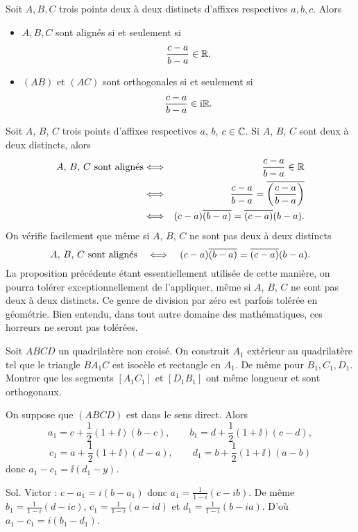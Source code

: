 \documentclass{magnolia}
\begin{document}
\begin{proposition}[utile=-3]
Soit $A,B,C$ trois points deux à deux distincts d'affixes respectives $a,b,c$. Alors
\begin{itemize}
\item $A,B,C$ sont alignés si et seulement si
  \[\frac{c-a}{b-a}\in\mathbb{R}.\]
\item $(AB)$ et $(AC)$ sont orthogonales si et seulement si
  \[\frac{c-a}{b-a}\in{\rm i}\mathbb{R}.\]
\end{itemize}
\end{proposition}

\begin{remarques}
\remarque Soit $A$, $B$, $C$ trois points d'affixes respectives $a$, $b$, $c\in\mathbb{C}$. Si $A$, $B$, $C$ sont deux à deux distincts, alors
  \begin{eqnarray*}
  \text{$A$, $B$, $C$ sont alignés}
  &\Longleftrightarrow& \frac{c-a}{b-a}\in\mathbb{R}\\
  &\Longleftrightarrow& \frac{c-a}{b-a}=\overline{\left(\frac{c-a}{b-a}\right)}\\
  &\Longleftrightarrow& (c-a)\overline{(b-a)}=\overline{(c-a)}(b-a).
  \end{eqnarray*}
  On vérifie facilement que même si $A$, $B$, $C$ ne sont pas deux à deux distincts
  \[\text{$A$, $B$, $C$ sont alignés} \quad\Longleftrightarrow\quad (c-a)\overline{(b-a)}=\overline{(c-a)}(b-a).\]
\remarque La proposition précédente étant essentiellement utilisée de cette manière, on pourra tolérer exceptionnellement de l'appliquer, même si $A$, $B$, $C$ ne sont pas deux à deux distincts. Ce genre de \og division par zéro \fg est parfois tolérée en géométrie. Bien entendu, dans tout autre domaine des mathématiques, ces horreurs ne seront pas tolérées.
\end{remarques}

\begin{exoUnique}
\exo Soit $ABCD$ un quadrilatère non croisé. On construit $A_1$ extérieur
au quadrilatère tel que le triangle $BA_1C$ est isocèle et
rectangle en $A_1$. De même pour $B_1,C_1,D_1$. Montrer que les
segments $[A_1C_1]$ et $[D_1B_1]$ ont même longueur et sont
orthogonaux.
\begin{sol}
On suppose que $(ABCD)$ est dans le sens direct. Alors
\[a_1=c+\frac{1}{2}(1+\ii)(b-c), \qquad
  b_1=d+\frac{1}{2}(1+\ii)(c-d),\]
\[c_1=a+\frac{1}{2}(1+\ii)(d-a), \qquad
  d_1=b+\frac{1}{2}(1+\ii)(a-b)\]
donc $a_1-c_1=\ii(d_1-y)$.

Sol. Victor :
$c-a_1=i(b-a_1)$ donc $a_1=\frac{1}{1-i}(c-ib)$. De même $b_1=\frac{1}{1-i}(d-ic)$, $c_1=\frac{1}{1-i}(a-id)$ et $d_1=\frac{1}{1-i}(b-ia)$. D'où $a_1-c_1=i(b_1-d_1)$.
\end{sol}
\end{exoUnique}
\end{document}

